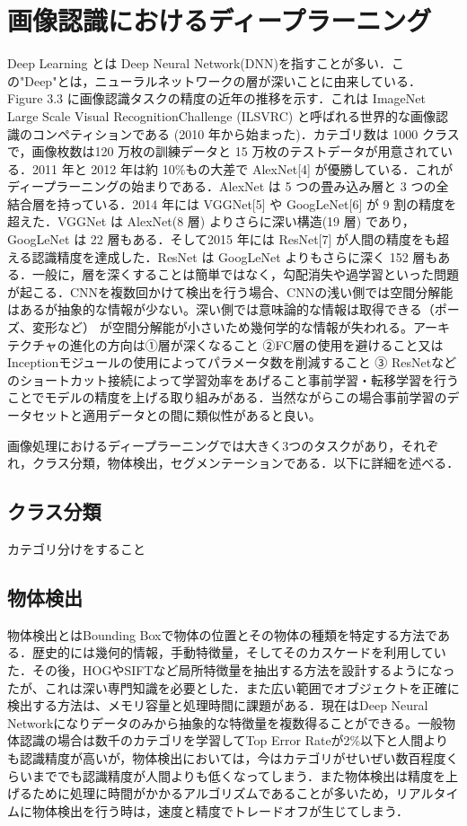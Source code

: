 \section{画像認識におけるディープラーニング}
Deep Learning とは Deep Neural Network(DNN)を指すことが多い．この"Deep"とは，ニューラルネットワークの層が深いことに由来している．
Figure 3.3 に画像認識タスクの精度の近年の推移を示す．これは ImageNet Large Scale Visual RecognitionChallenge (ILSVRC) と呼ばれる世界的な画像認識のコンペティションである (2010 年から始まった)．カテゴリ数は 1000 クラスで，画像枚数は120 万枚の訓練データと 15 万枚のテストデータが用意されている．2011 年と 2012 年は約 10\%もの大差で AlexNet[4] が優勝している．これがディープラーニングの始まりである．AlexNet は 5 つの畳み込み層と 3 つの全結合層を持っている．2014 年には VGGNet[5] や GoogLeNet[6] が 9 割の精度を超えた．VGGNet は AlexNet(8 層) よりさらに深い構造(19 層) であり，GoogLeNet は 22 層もある．そして2015 年には ResNet[7] が人間の精度をも超える認識精度を達成した．ResNet は GoogLeNet よりもさらに深く 152 層もある．一般に，層を深くすることは簡単ではなく，勾配消失や過学習といった問題が起こる．CNNを複数回かけて検出を行う場合、CNNの浅い側では空間分解能はあるが抽象的な情報が少ない。深い側では意味論的な情報は取得できる（ポーズ、変形など） が空間分解能が小さいため幾何学的な情報が失われる。アーキテクチャの進化の方向は①層が深くなること ②FC層の使用を避けること又はInceptionモジュールの使用によってパラメータ数を削減すること ③ ResNetなどのショートカット接続によって学習効率をあげること事前学習・転移学習を行うことでモデルの精度を上げる取り組みがある．当然ながらこの場合事前学習のデータセットと適用データとの間に類似性があると良い。

画像処理におけるディープラーニングでは大きく3つのタスクがあり，それぞれ，クラス分類，物体検出，セグメンテーションである．以下に詳細を述べる．

\subsection*{クラス分類}
カテゴリ分けをすること

\subsection*{物体検出}
物体検出とはBounding Boxで物体の位置とその物体の種類を特定する方法である．歴史的には幾何的情報，手動特徴量，そしてそのカスケードを利用していた．その後，HOGやSIFTなど局所特徴量を抽出する方法を設計するようになったが、これは深い専門知識を必要とした．また広い範囲でオブジェクトを正確に検出する方法は、メモリ容量と処理時間に課題がある．現在はDeep Neural Networkになりデータのみから抽象的な特徴量を複数得ることができる。一般物体認識の場合は数千のカテゴリを学習してTop Error Rateが2\%以下と人間よりも認識精度が高いが，物体検出においては，今はカテゴリがせいぜい数百程度くらいまででも認識精度が人間よりも低くなってしまう．また物体検出は精度を上げるために処理に時間がかかるアルゴリズムであることが多いため，リアルタイムに物体検出を行う時は，速度と精度でトレードオフが生じてしまう．

